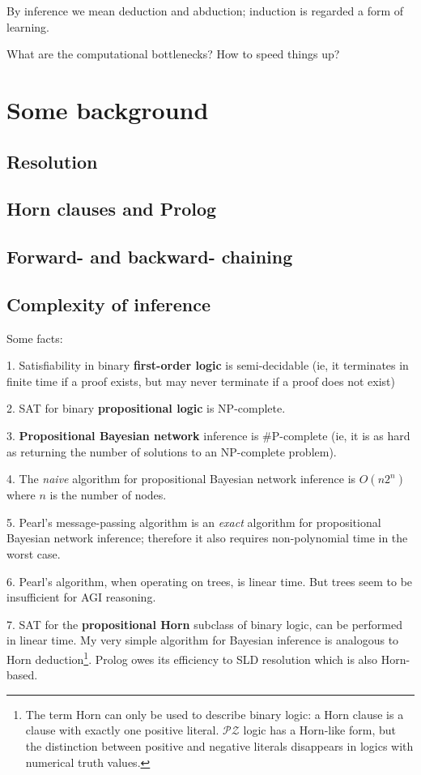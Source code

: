\documentclass[a4paper]{report}
\begin{document}
By inference we mean deduction and abduction;  induction is regarded a form of learning.

What are the computational bottlenecks?  How to speed things up?

\section{Some background}

\subsection{Resolution}
\label{sec:resolution}

\subsection{Horn clauses and Prolog}

\subsection{Forward- and backward- chaining}

\subsection{Complexity of inference}

Some facts:

1.  Satisfiability in binary \textbf{first-order logic} is semi-decidable (ie, it terminates in finite time if a proof exists, but may never terminate if a proof does not exist)

2.  SAT for binary \textbf{propositional logic} is NP-complete.

3.  \textbf{Propositional Bayesian network} inference is \#P-complete (ie, it is as hard as returning the number of solutions to an NP-complete problem).

4.  The \textit{naive} algorithm for propositional Bayesian network inference is $O(n 2^n)$ where $n$ is the number of nodes.

5.  Pearl's message-passing algorithm is an \textit{exact} algorithm for propositional Bayesian network inference;  therefore it also requires non-polynomial time in the worst case.

6.  Pearl's algorithm, when operating on trees, is linear time.  But trees seem to be insufficient for AGI reasoning.

7.  SAT for the \textbf{propositional Horn} subclass of binary logic, can be performed in linear time.  My very simple algorithm for Bayesian inference is analogous to Horn deduction\footnote{The term Horn can only be used to describe binary logic:  a Horn clause is a clause with exactly one positive literal.  $\mathcal{PZ}$ logic has a Horn-like form, but the distinction between positive and negative literals disappears in logics with numerical truth values.}.  Prolog owes its efficiency to SLD resolution which is also Horn-based.
\end{document}
